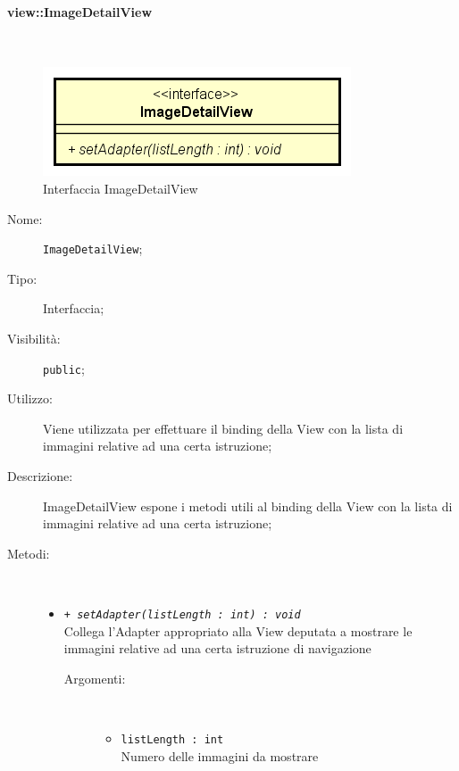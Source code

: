 \documentclass[../DefinizioneDiProdotto.tex]{subfiles}
\begin{document}
\paragraph{view::ImageDetailView}
\
\begin{figure}[H]
	\centering
	\includegraphics[width=\maxwidth]{img/ImageDetailView.png}
	\caption{Interfaccia ImageDetailView}\label{fig:view::ImageDetailView} 
\end{figure}
\begin{description}
	\item[Nome:] \texttt{ImageDetailView};
	\item[Tipo:] Interfaccia;
	\item[Visibilità:] \texttt{public};
	\item[Utilizzo:] Viene utilizzata per effettuare il binding della View con la lista di immagini relative ad una certa istruzione;
	\item[Descrizione:] ImageDetailView espone i metodi utili al binding della View con la lista di immagini relative ad una certa istruzione;
	\item[Metodi:] \
	\begin{itemize}
		\item \texttt{+ \textit{setAdapter(listLength : int) : void}}\\
		Collega l'Adapter appropriato alla View deputata a mostrare le immagini relative ad una certa istruzione di navigazione
		\begin{description}
			\item[Argomenti:] \
			\begin{itemize}
				\item \texttt{listLength : int}\\
				Numero delle immagini da mostrare\end{itemize}
		\end{description}
	\end{itemize}
\end{description}
\end{document}
